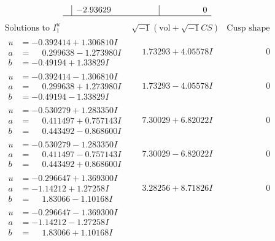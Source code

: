 \documentclass[1p]{elsarticle_modified}
\theoremstyle{definition}
\newcommand{\I}{\sqrt{-1}}
\begin{document}
$$\begin{array}{c|c|c}
 & -2.93629\phantom{ +0.000000I} & \phantom{-0.000000 } 0\\
 \hline 
 \end{array}$$\newpage$$\begin{array}{c|c|c}  
\text{Solutions to }I^u_{1}& \I (\text{vol} + \sqrt{-1}CS) & \text{Cusp shape}\\
 \hline 
\begin{aligned}
u &= -0.392414 + 1.306810 I \\
a &= \phantom{-}0.299638 - 1.273980 I \\
b &= -0.49194 + 1.33829 I\end{aligned}
 & \phantom{-}1.73293 + 4.05578 I & \phantom{-0.000000 } 0 \\ \hline\begin{aligned}
u &= -0.392414 - 1.306810 I \\
a &= \phantom{-}0.299638 + 1.273980 I \\
b &= -0.49194 - 1.33829 I\end{aligned}
 & \phantom{-}1.73293 - 4.05578 I & \phantom{-0.000000 } 0 \\ \hline\begin{aligned}
u &= -0.530279 + 1.283350 I \\
a &= \phantom{-}0.411497 + 0.757143 I \\
b &= \phantom{-}0.443492 - 0.868600 I\end{aligned}
 & \phantom{-}7.30029 + 6.82022 I & \phantom{-0.000000 } 0 \\ \hline\begin{aligned}
u &= -0.530279 - 1.283350 I \\
a &= \phantom{-}0.411497 - 0.757143 I \\
b &= \phantom{-}0.443492 + 0.868600 I\end{aligned}
 & \phantom{-}7.30029 - 6.82022 I & \phantom{-0.000000 } 0 \\ \hline\begin{aligned}
u &= -0.296647 + 1.369300 I \\
a &= -1.14212 + 1.27258 I \\
b &= \phantom{-}1.83066 - 1.10168 I\end{aligned}
 & \phantom{-}3.28256 + 8.71826 I & \phantom{-0.000000 } 0 \\ \hline\begin{aligned}
u &= -0.296647 - 1.369300 I \\
a &= -1.14212 - 1.27258 I \\
b &= \phantom{-}1.83066 + 1.10168 I\end{aligned}

\end{array}$$
\end{document}

